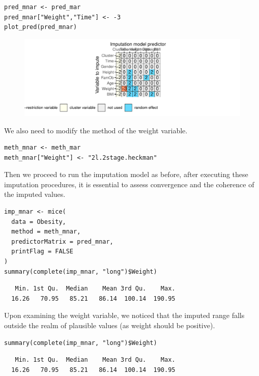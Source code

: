 \documentclass[
  article]{jss}
\begin{document}
\begin{verbatim}
pred_mnar <- pred_mar
pred_mnar["Weight","Time"] <- -3
plot_pred(pred_mnar)
\end{verbatim}

\begin{figure}[h]

{\centering \includegraphics{manuscript_files/figure-pdf/obesity-predmnar-1.pdf}

}

\end{figure}

We also need to modify the method of the weight variable.

\begin{verbatim}
meth_mnar <- meth_mar
meth_mnar["Weight"] <- "2l.2stage.heckman"
\end{verbatim}

Then we proceed to run the imputation model as before, after executing
these imputation procedures, it is essential to assess convergence and
the coherence of the imputed values.

\begin{verbatim}
imp_mnar <- mice(
  data = Obesity,
  method = meth_mnar,
  predictorMatrix = pred_mnar,
  printFlag = FALSE
)
summary(complete(imp_mnar, "long")$Weight)
\end{verbatim}

\begin{verbatim}
   Min. 1st Qu.  Median    Mean 3rd Qu.    Max. 
  16.26   70.95   85.21   86.14  100.14  190.95 
\end{verbatim}

Upon examining the weight variable, we noticed that the imputed range
falls outside the realm of plausible values (as weight should be
positive).

\begin{verbatim}
summary(complete(imp_mnar, "long")$Weight)
\end{verbatim}

\begin{verbatim}
   Min. 1st Qu.  Median    Mean 3rd Qu.    Max. 
  16.26   70.95   85.21   86.14  100.14  190.95 
\end{verbatim}
\end{document}
